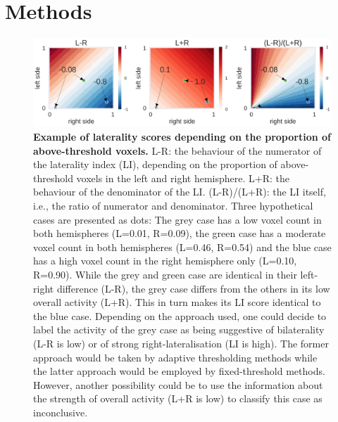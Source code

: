 \documentclass[fleqn,10pt]{SelfArx} %
\begin{document}
\section{Methods}

\begin{figure}[htb]
	\begin{minipage}{\textwidth}
		\renewcommand{\familydefault}{\sfdefault}\normalfont
		\centering
		\includegraphics[width=0.95\columnwidth]{../reports/figures/01-li-space-example.png}
		\caption{\textbf{Example of laterality scores depending on the proportion of above-threshold voxels.} L-R: the behaviour of the numerator of the laterality index (LI), depending on the proportion of above-threshold voxels in the left and right hemisphere. L+R: the behaviour of the denominator of the LI. (L-R)/(L+R): the LI itself, i.e., the ratio of numerator and denominator. Three hypothetical cases are presented as dots: The grey case has a low voxel count in both hemispheres (L=0.01, R=0.09), the green case has a moderate voxel count in both hemispheres (L=0.46, R=0.54) and the blue case has a high voxel count in the right hemisphere only (L=0.10, R=0.90). While the grey and green case are identical in their left-right difference (L-R), the grey case differs from the others in its low overall activity (L+R). This in turn makes its LI score identical to the blue case. Depending on the approach used, one could decide to label the activity of the grey case as being suggestive of bilaterality (L-R is low) or of strong right-lateralisation (LI is high). The former approach would be taken by adaptive thresholding methods while the latter approach would be employed by fixed-threshold methods. However, another possibility could be to use the information about the strength of overall activity (L+R is low) to classify this case as inconclusive.}%
		\label{fig:example}
	\end{minipage}
\end{figure}
\end{document}

